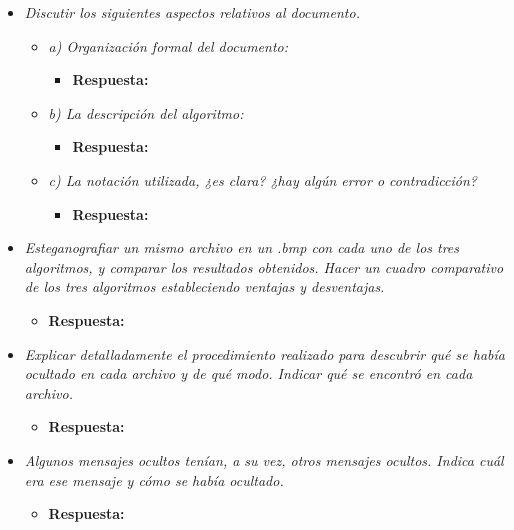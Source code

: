 \documentclass[a4paper,12pt]{article}
\begin{document}
	\begin{itemize}
		\item \textit{Discutir los siguientes aspectos relativos al documento.}
		\begin{itemize}
			\item \textit{a) Organización formal del documento:}
			\begin{itemize}
				\item \textbf{Respuesta:} 
			\end{itemize}
			
			\item \textit{b) La descripción del algoritmo:}
			\begin{itemize}
				\item \textbf{Respuesta:} 
			\end{itemize}
			
			\item \textit{c) La notación utilizada, ¿es clara? ¿hay algún error o contradicción?}
			\begin{itemize}
				\item \textbf{Respuesta:} 
			\end{itemize}
		\end{itemize}
		
		\item \textit{Esteganografiar un mismo archivo en un .bmp con cada uno de los tres algoritmos, y comparar los resultados obtenidos. Hacer un cuadro comparativo de los tres algoritmos estableciendo ventajas y desventajas.}
		\begin{itemize}
			\item \textbf{Respuesta:} 
		\end{itemize}
		
		\item \textit{Explicar detalladamente el procedimiento realizado para descubrir qué se había ocultado en cada archivo y de qué modo. Indicar qué se encontró en cada archivo.}
		\begin{itemize}
			\item \textbf{Respuesta:} 
		\end{itemize}
		
		\item \textit{Algunos mensajes ocultos tenían, a su vez, otros mensajes ocultos. Indica cuál era ese mensaje y cómo se había ocultado.}
		\begin{itemize}
			\item \textbf{Respuesta:} 
		\end{itemize}
		

\end{itemize}
\end{document}
